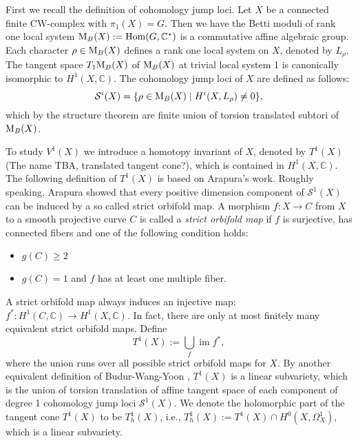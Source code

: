 \documentclass[a4paper,12pt,reqno]{amsart}
\theoremstyle{plain}
\theoremstyle{definition}
\theoremstyle{remark}
\newcommand{\C}{\mathbb C}
\newcommand{\im}{\operatorname{im}}
\newcommand{\Hom}{\operatorname{Hom}}
\begin{document}

First we recall the definition of cohomology jump loci. Let $X$ be a connected finite CW-complex with $\pi_{1}(X)=G$. Then we have the Betti moduli of rank one local system $\textnormal{M}_B(X):= \Hom(G,\C^{\ast})$ is a commutative affine algebraic group. Each character $\rho \in \textnormal{M}_B(X)$ defines a rank one local system on $X$, denoted by $L_{\rho}$. The tangent space $T_1\textnormal{M}_B(X)$ of $\textnormal{M}_B(X)$ at trivial local system 1 is canonically isomorphic to $H^1(X, \C)$.
The cohomology jump loci of $X$ are defined as follows:
$$\mathcal{S}^i(X)=\lbrace \rho\in \textnormal{M}_B(X) \mid  H^{i}(X, L_{\rho})\neq 0 \rbrace,$$ 
which by the structure theorem are finite union of torsion translated subtori of $\textnormal{M}_B(X)$.

To study $V^1(X)$ we introduce a homotopy invariant of $X$, denoted by $T^1(X)${\color{red} (The name TBA, translated tangent cone?)}, which is contained in $H^1(X, \C)$. The following definition of $T^1(X)$ is based on Arapura's work. Roughly speaking, Arapura \cite{Ara97} showed that every positive dimension component of $\mathcal{S}^1(X)$ can be induced by a so called strict orbifold map. A morphism $f:X\to C$ from $X$ to a smooth projective curve $C$ is called a  {\it strict orbifold map} if $f $ is surjective, has connected fibers and one of the following condition holds:
\begin{itemize}
\item $g(C)\geq 2$
\item $g(C)=1$ and $f$ has at least one multiple fiber.
\end{itemize}
A strict orbifold map always induces an injective map: $f^*: H^1(C, \C) \to H^1(X,\C)$. In fact, there are only at most finitely many equivalent strict orbifold maps. Define $$T^1(X):= \bigcup_f \im f^*,$$
where the union runs over all possible strict orbifold maps for $X$. By another equivalent definition of Budur-Wang-Yoon \cite{BWY16} , $T^1(X)$ is a linear subvariety, which is the union of torsion translation of affine tangent space of each component of degree 1 cohomology jump loci $\mathcal{S}^1(X)$. We denote the holomorphic part of the tangent cone $T^1(X)$ to be $T^1_h(X)$, i.e., $T_h^1(X):=T^1(X)\cap H^0(X, \Omega_X^1)$, which is a linear subvariety.
\end{document}
